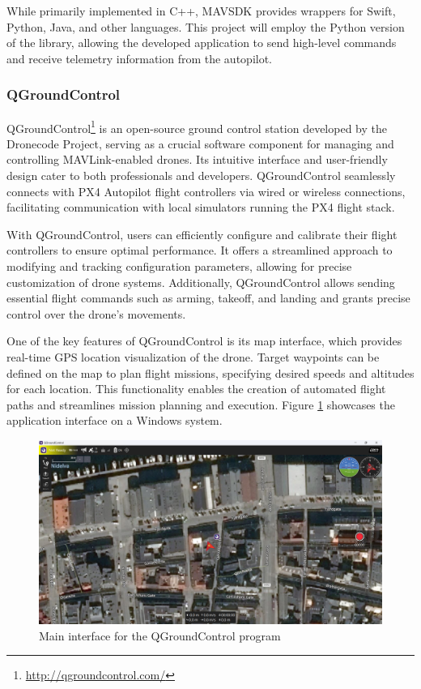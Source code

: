 While primarily implemented in C++, MAVSDK provides wrappers for Swift, Python, Java, and other languages. This project will employ the Python version of the library, allowing the developed application to send high-level commands and receive telemetry information from the autopilot.


\subsubsection{QGroundControl}
\label{subsec:qgc}

QGroundControl\footnote{\url{http://qgroundcontrol.com/}} is an open-source ground control station developed by the Dronecode Project, serving as a crucial software component for managing and controlling MAVLink-enabled drones. Its intuitive interface and user-friendly design cater to both professionals and developers. QGroundControl seamlessly connects with PX4 Autopilot flight controllers via wired or wireless connections, facilitating communication with local simulators running the PX4 flight stack.

With QGroundControl, users can efficiently configure and calibrate their flight controllers to ensure optimal performance. It offers a streamlined approach to modifying and tracking configuration parameters, allowing for precise customization of drone systems. Additionally, QGroundControl allows sending essential flight commands such as arming, takeoff, and landing and grants precise control over the drone's movements.

One of the key features of QGroundControl is its map interface, which provides real-time GPS location visualization of the drone. Target waypoints can be defined on the map to plan flight missions, specifying desired speeds and altitudes for each location. This functionality enables the creation of automated flight paths and streamlines mission planning and execution. Figure \ref{fig:qgc-map} showcases the application interface on a Windows system.

\begin{figure}
  \centering
  \includegraphics[width=\textwidth,keepaspectratio]{img/qgc-map.png}
  \caption{Main interface for the QGroundControl program}
  \label{fig:qgc-map}
\end{figure}

